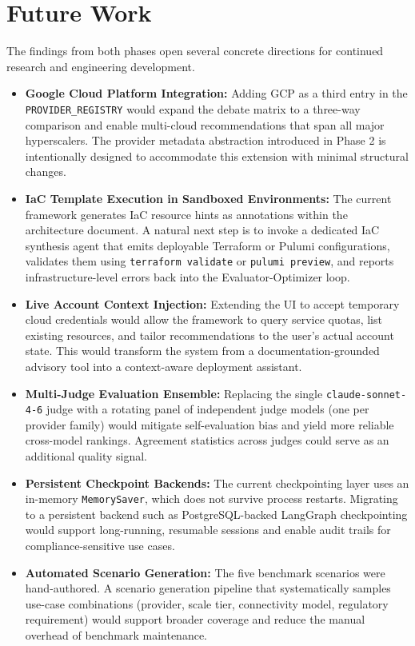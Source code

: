 \section{Future Work}

The findings from both phases open several concrete directions for continued research and engineering development.

\begin{itemize}
    \item \textbf{Google Cloud Platform Integration:} Adding GCP as a third entry in the \texttt{PROVIDER\_REGISTRY} would expand the debate matrix to a three-way comparison and enable multi-cloud recommendations that span all major hyperscalers. The provider metadata abstraction introduced in Phase 2 is intentionally designed to accommodate this extension with minimal structural changes.

    \item \textbf{IaC Template Execution in Sandboxed Environments:} The current framework generates IaC resource hints as annotations within the architecture document. A natural next step is to invoke a dedicated IaC synthesis agent that emits deployable Terraform or Pulumi configurations, validates them using \texttt{terraform validate} or \texttt{pulumi preview}, and reports infrastructure-level errors back into the Evaluator-Optimizer loop.

    \item \textbf{Live Account Context Injection:} Extending the UI to accept temporary cloud credentials would allow the framework to query service quotas, list existing resources, and tailor recommendations to the user's actual account state. This would transform the system from a documentation-grounded advisory tool into a context-aware deployment assistant.

    \item \textbf{Multi-Judge Evaluation Ensemble:} Replacing the single \texttt{claude-sonnet-4-6} judge with a rotating panel of independent judge models (one per provider family) would mitigate self-evaluation bias and yield more reliable cross-model rankings. Agreement statistics across judges could serve as an additional quality signal.

    \item \textbf{Persistent Checkpoint Backends:} The current checkpointing layer uses an in-memory \texttt{MemorySaver}, which does not survive process restarts. Migrating to a persistent backend such as PostgreSQL-backed LangGraph checkpointing would support long-running, resumable sessions and enable audit trails for compliance-sensitive use cases.

    \item \textbf{Automated Scenario Generation:} The five benchmark scenarios were hand-authored. A scenario generation pipeline that systematically samples use-case combinations (provider, scale tier, connectivity model, regulatory requirement) would support broader coverage and reduce the manual overhead of benchmark maintenance.
\end{itemize}
